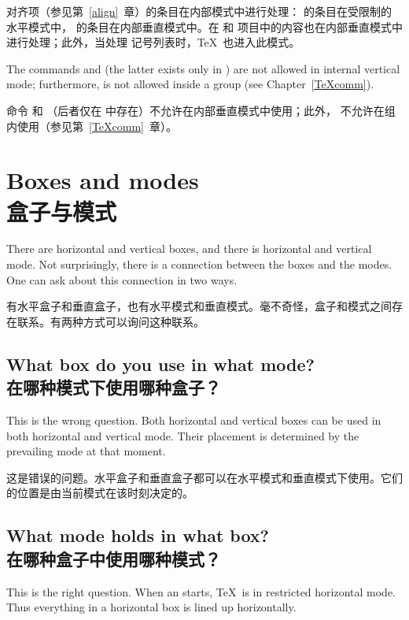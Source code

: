 对齐项（参见第~\ref{align}~章）的条目在内部模式中进行处理： 的条目在受限制的水平模式中， 的条目在内部垂直模式中。在  和  项目中的内容也在内部垂直模式中进行处理；此外，当处理  记号列表时，\TeX\ 也进入此模式。

The commands  and  (the latter exists only in \IniTeX)
are not allowed in
internal vertical mode; furthermore,  is not allowed
inside a group (see Chapter~\ref{TeXcomm}).

命令  和 （后者仅在 \IniTeX 中存在）不允许在内部垂直模式中使用；此外， 不允许在组内使用（参见第~\ref{TeXcomm}~章）。


\section{Boxes and modes\\盒子与模式}
\label{hvbox}

There are horizontal and vertical boxes, and there is
horizontal and vertical mode. Not surprisingly, there is
a connection between the boxes and the modes.
One can ask about this connection in two ways.

有水平盒子和垂直盒子，也有水平模式和垂直模式。毫不奇怪，盒子和模式之间存在联系。有两种方式可以询问这种联系。

\subsection{What box do you use in what mode?\\在哪种模式下使用哪种盒子？}

This is the wrong question. Both horizontal  and vertical boxes
can be used in both horizontal and vertical mode. 
Their placement is determined by the prevailing mode at that moment.

这是错误的问题。水平盒子和垂直盒子都可以在水平模式和垂直模式下使用。它们的位置是由当前模式在该时刻决定的。
\subsection{What mode holds in what box?\\在哪种盒子中使用哪种模式？}

This is the right question.
When an  starts, \TeX\ is in restricted horizontal
mode. Thus everything in a horizontal box is lined up horizontally.

